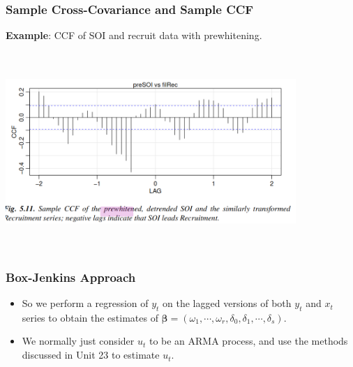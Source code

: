\documentclass[%
xcolor=pdftex]{beamer}
\begin{document}
\begin{frame}
\frametitle{Sample Cross-Covariance and Sample CCF}

\textbf{Example}: CCF of SOI and recruit data with prewhitening.

\includegraphics[width=110mm, height=75mm]{Screenshot from 2020-11-18 16-11-59.png}

\end{frame}



\begin{frame}
\frametitle{Box-Jenkins Approach}

\begin{itemize}
\item So we perform a regression of $y_t$ on the lagged versions of both $y_t$ and $x_t$ series to obtain the estimates of $\boldsymbol{\beta} = (\omega_1, \cdots, \omega_r, \delta_0, \delta_1, \cdots, \delta_s)$.
\item We normally just consider $u_t$ to be an ARMA process, and use the methods discussed in Unit 23 to estimate $u_t$.
\end{itemize}

\end{frame}
\end{document}
